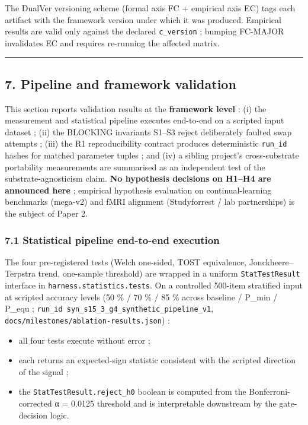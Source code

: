 \documentclass[
]{article}
\providecommand{\tightlist}{%
  \setlength{\itemsep}{0pt}\setlength{\parskip}{0pt}}
\begin{document}
The DualVer versioning scheme (formal axis FC + empirical axis EC) tags
each artifact with the framework version under which it was produced.
Empirical results are valid only against the declared
\texttt{c\_version} ; bumping FC-MAJOR invalidates EC and requires
re-running the affected matrix.

\begin{center}\rule{0.5\linewidth}{0.5pt}\end{center}

\subsection{7. Pipeline and framework
validation}\label{pipeline-and-framework-validation}

This section reports validation results at the \textbf{framework level}
: (i) the measurement and statistical pipeline executes end-to-end on a
scripted input dataset ; (ii) the BLOCKING invariants S1--S3 reject
deliberately faulted swap attempts ; (iii) the R1 reproducibility
contract produces deterministic \texttt{run\_id} hashes for matched
parameter tuples ; and (iv) a sibling project's cross-substrate
portability measurements are summarised as an independent test of the
substrate-agnosticism claim. \textbf{No hypothesis decisions on H1--H4
are announced here} ; empirical hypothesis evaluation on
continual-learning benchmarks (mega-v2) and fMRI alignment (Studyforrest
/ lab partnerships) is the subject of Paper 2.

\subsubsection{7.1 Statistical pipeline end-to-end
execution}\label{statistical-pipeline-end-to-end-execution}

The four pre-registered tests (Welch one-sided, TOST equivalence,
Jonckheere--Terpstra trend, one-sample threshold) are wrapped in a
uniform \texttt{StatTestResult} interface in
\texttt{harness.statistics.tests}. On a controlled 500-item stratified
input at scripted accuracy levels (50 \% / 70 \% / 85 \% across baseline
/ P\_min / P\_equ ;
\texttt{run\_id\ syn\_s15\_3\_g4\_synthetic\_pipeline\_v1},
\texttt{docs/milestones/ablation-results.json}) :

\begin{itemize}
\tightlist
\item
  all four tests execute without error ;
\item
  each returns an expected-sign statistic consistent with the scripted
  direction of the signal ;
\item
  the \texttt{StatTestResult.reject\_h0} boolean is computed from the
  Bonferroni-corrected α = 0.0125 threshold and is interpretable
  downstream by the gate-decision logic.
\end{itemize}
\end{document}
